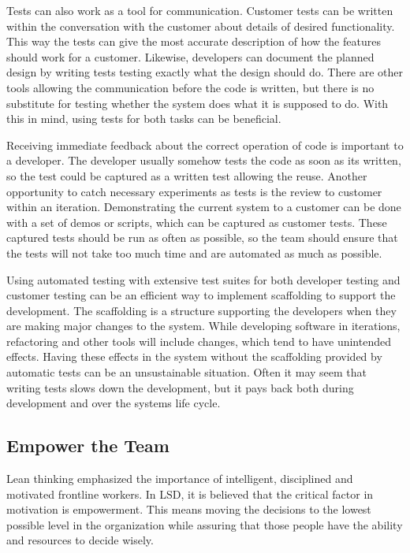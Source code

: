 Tests can also work as a tool for communication. Customer tests can be written within the conversation with the customer about details of desired functionality. This way the tests can give the most accurate description of how the features should work for a customer. Likewise, developers can document the planned design by writing tests testing exactly what the design should do. There are other tools allowing the communication before the code is written, but there is no substitute for testing whether the system does what it is supposed to do. With this in mind, using tests for both tasks can be beneficial.~\cite{poppendieck2003LSD}

Receiving immediate feedback about the correct operation of code is important to a developer. The developer usually somehow tests the code as soon as its written, so the test could be captured as a written test allowing the reuse. Another opportunity to catch necessary experiments as tests is the review to customer within an iteration. Demonstrating the current system to a customer can be done with a set of demos or scripts, which can be captured as customer tests. These captured tests should be run as often as possible, so the team should ensure that the tests will not take too much time and are automated as much as possible.~\cite{poppendieck2003LSD}

Using automated testing with extensive test suites for both developer testing and customer testing can be an efficient way to implement scaffolding to support the development. The scaffolding is a structure supporting the developers when they are making major changes to the system. While developing software in iterations, refactoring and other tools will include changes, which tend to have unintended effects. Having these effects in the system without the scaffolding provided by automatic tests can be an unsustainable situation. Often it may seem that writing tests slows down the development, but it pays back both during development and over the systems life cycle.~\cite{poppendieck2003LSD}

\subsection{Empower the Team}

Lean thinking emphasized the importance of intelligent, disciplined and motivated frontline workers. In LSD, it is believed that the critical factor in motivation is empowerment. This means moving the decisions to the lowest possible level in the organization while assuring that those people have the ability and resources to decide wisely.~\cite{poppendieck2003LSD}

